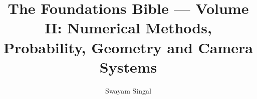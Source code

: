 \documentclass[11pt,twoside]{book}
\title{The Foundations Bible --- Volume II: Numerical Methods, Probability, Geometry and Camera Systems}
\author{Swayam Singal}
\begin{document}
\maketitle
\hypertarget{volume-reading-map}{}
\tableofcontents
\mainmatter
\setcounter{chapter}{20}



















\appendix
\end{document}
